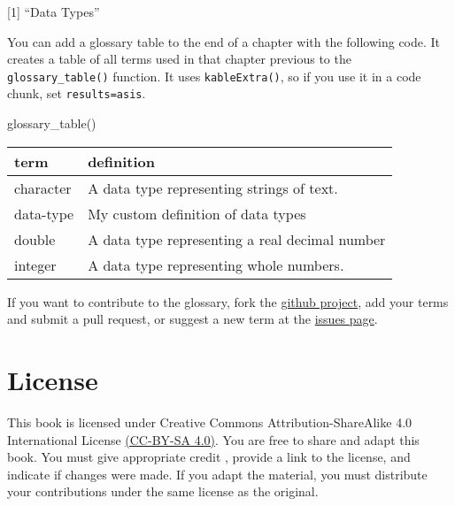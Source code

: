 \documentclass[
  oneside]{book}
\newenvironment{Shaded}{\begin{snugshade}}{\end{snugshade}}
\newcommand{\FunctionTok}[1]{\textcolor[rgb]{0.00,0.00,0.00}{#1}}
\newcommand{\NormalTok}[1]{#1}
\begin{document}
{[}1{]} ``Data Types''

You can add a glossary table to the end of a chapter with the following code. It creates a table of all terms used in that chapter previous to the \texttt{glossary\_table()} function. It uses \texttt{kableExtra()}, so if you use it in a code chunk, set \texttt{results=\textquotesingle{}asis\textquotesingle{}}.

\begin{Shaded}
\begin{Highlighting}[]
\FunctionTok{glossary\_table}\NormalTok{()}
\end{Highlighting}
\end{Shaded}

\begin{tabular}{l|l}
\hline
term & definition\\
\hline
character & A data type representing strings of text.\\
\hline
data-type & My custom definition of data types\\
\hline
double & A data type representing a real decimal number\\
\hline
integer & A data type representing whole numbers.\\
\hline
\end{tabular}

If you want to contribute to the glossary, fork the \href{https://github.com/PsyTeachR/glossary}{github project}, add your terms and submit a pull request, or suggest a new term at the \href{https://github.com/PsyTeachR/glossary/issues}{issues page}.

\hypertarget{license}{%
\chapter*{License}\label{license}}

This book is licensed under Creative Commons Attribution-ShareAlike 4.0 International License \href{https://creativecommons.org/licenses/by-sa/4.0/}{(CC-BY-SA 4.0)}. You are free to share and adapt this book. You must give appropriate credit \citep{psyteachr-template}, provide a link to the license, and indicate if changes were made. If you adapt the material, you must distribute your contributions under the same license as the original.

  
\end{document}
